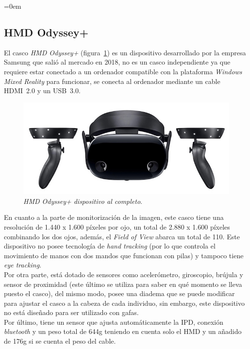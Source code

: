 \parindent=0em
\subsection{HMD Odyssey+}
\label{sec:odyssey}
\noindent


El casco \textit{HMD Odyssey+} (figura~\ref{fig:hdmOdysseyVista}) es un dispositivo desarrollado por la empresa Samsung que salió al mercado en 2018, no es un casco independiente ya que requiere estar conectado a un ordenador compatible con la plataforma \textit{Windows Mixed Reality} para funcionar, se conecta al ordenador mediante un cable HDMI~2.0 y un USB~3.0.

\begin{figure}[h]
    \centering
    \includegraphics[scale=0.6]{Images/Estado del arte/samsungOdysseyplus.jpg}
    \caption[\textit{HMD Odyssey+ dispositivo al completo}]{\textit{HMD Odyssey+ dispositivo al completo}\footnotemark.}
    \label{fig:hdmOdysseyVista}
\end{figure}

En cuanto a la parte de monitorización de la imagen, este casco tiene una resolución de 1.440 x 1.600 píxeles por ojo, un total de 2.880 x 1.600 píxeles combinando los dos ojos, además, el \textit{Field of View} abarca un total de 110\degree . Este dispositivo no posee tecnología de \textit{hand tracking} (por lo que controla el movimiento de manos con dos mandos que funcionan con pilas) y tampoco tiene \textit{eye tracking}.\\

Por otra parte, está dotado de sensores como acelerómetro, giroscopio, brújula y sensor de proximidad (este último se utiliza para saber en qué momento se lleva puesto el casco), del mismo modo, posee una diadema que se puede  modificar para ajustar el casco a la cabeza de cada individuo, sin embargo, este dispositivo no está diseñado para ser utilizado con gafas.\\ 

Por último, tiene un sensor que ajusta automáticamente la IPD, conexión \textit{bluetooth} y un peso total de 644g teniendo en cuenta solo el HMD y un añadido de 176g si se cuenta el peso del cable.
